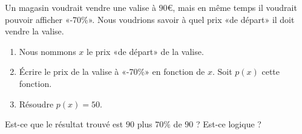 
\begin{exercice}\label{exoSeconde-0067}

    Un magasin voudrait vendre une valise à \( 90€\), mais en même temps il voudrait pouvoir afficher «-70\%». Nous voudrions savoir à quel prix «de départ» il doit vendre la valise.
    \begin{enumerate}
        \item
            Nous nommons \( x\) le prix «de départ» de la valise.
        \item
            Écrire le prix de la valise à «-70\%» en fonction de \( x\). Soit \( p(x)\) cette fonction.
        \item
            Résoudre \( p(x)=50\).
    \end{enumerate}
    Est-ce que le résultat trouvé est \( 90\) plus \( 70\%\) de \( 90\) ? Est-ce logique ?

\end{exercice}
